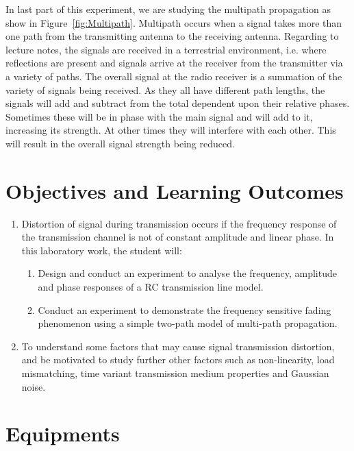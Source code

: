 \documentclass[a4paper, 12pt, english]{article}
\begin{document}
In last part of this experiment, we are studying the multipath propagation as show in Figure~\ref{fig:Multipath}. Multipath occurs when a signal takes more than one path from the transmitting antenna to the receiving antenna. Regarding to lecture notes, the signals are received in a terrestrial environment, i.e. where reflections are present and signals arrive at the receiver from the transmitter via a variety of paths. The overall signal at the radio receiver is a summation of the variety of signals being received. As they all have different path lengths, the signals will add and subtract from the total dependent upon their relative phases. Sometimes these will be in phase with the main signal and will add to it, increasing its strength. At other times they will interfere with each other. This will result in the overall signal strength being reduced. 

\newpage
\section{Objectives and Learning Outcomes}
 \begin{enumerate}
   \item Distortion of signal during transmission occurs if the frequency response of the transmission channel is not of constant amplitude and linear phase. In this laboratory work, the student will:

   			\begin{enumerate}
   		\item Design and conduct an experiment to analyse the frequency, amplitude and
      phase responses of a RC transmission line model.
   		\item Conduct an experiment to demonstrate the frequency sensitive fading phenomenon using a simple two-path model of multi-path propagation.
  		\end{enumerate}
        \item To understand some factors that may cause signal transmission distortion, and be motivated to study further other factors such as non-linearity, load mismatching, time variant transmission medium properties and Gaussian noise.  
  			\end{enumerate}


\section{Equipments}
\end{document}
